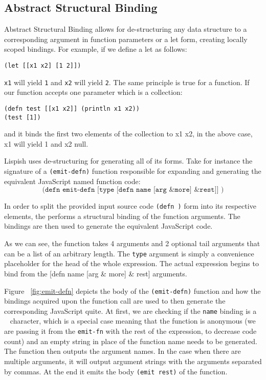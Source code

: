 \subsection{Abstract Structural Binding}
Abstract Structural Binding allows for de-structuring any data structure to a corresponding argument in function parameters or a let form, creating locally scoped bindings.
For example, if we define a let as follows:
\begin{verbatim}
(let [[x1 x2] [1 2]])
\end{verbatim}
\texttt{x1} will yield \texttt{1} and \texttt{x2} will yield \texttt{2}.
The same principle is true for a function.
If our function accepts one parameter which is a collection:

\begin{verbatim}
(defn test [[x1 x2]] (println x1 x2))
(test [1])
\end{verbatim}
and it binds the first two elements of the collection to x1 x2, in the above case, x1 will yield 1 and x2 null.

Lispish uses de-structuring for generating all of its forms. 
Take for instance the signature of a \texttt{(emit-defn)} function responsible for expanding and generating the equivalent JavaScript named function code:
$$ \texttt{(defn emit-defn [type [defn name [arg \& more] \& rest]] )} $$

In order to split the provided input source code \texttt{(defn )} form into its respective elements, the  performs a structural binding of the function arguments. The bindings are then used to generate the equivalent JavaScript code. 

As we can see, the function takes 4 arguments and 2 optional tail arguments that can be a list of an arbitrary length. The \texttt{type} argument is simply a convenience placeholder for the head of the whole expression.
The actual expression begins to bind from the [defn name [arg \& more] \& rest] arguments. 



Figure ~\ref{fig:emit-defn} depicts the body of the \texttt{(emit-defn)} function and how the bindings acquired upon the function call are used to then generate the corresponding JavaScript quite. 
At first, we are checking if the \texttt{name} binding is a \texttt{~} character, which is a special case meaning that the function is anonymous (we are passing it from the \texttt{emit-fn} with the rest of the expression, to decrease code count) and an empty string in place of the function name needs to be generated. The function then outputs the argument names. In the case when there are multiple arguments, it will output argument strings with the arguments separated by commas. 
At the end it emits the body \texttt{(emit rest)} of the function.

